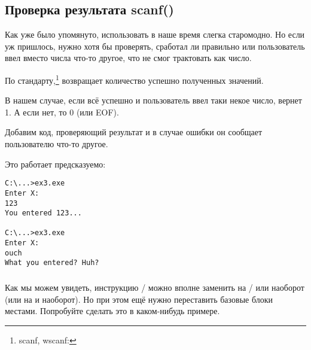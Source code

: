 \subsection{Проверка результата scanf()}

Как уже было упомянуто, использовать \scanf в наше время слегка старомодно. 
Но если уж пришлось, нужно хотя бы проверять, сработал ли \scanf 
правильно или пользователь ввел вместо числа что-то другое, что \scanf не смог трактовать как число.



По стандарту,\scanf\footnote{scanf, wscanf: \MSDNscanf} возвращает количество успешно полученных значений.

В нашем случае, если всё успешно и пользователь ввел таки некое число, \scanf вернет 1. А если нет, то 0 (или \ac{EOF}).

Добавим код, проверяющий результат \scanf и в случае ошибки он сообщает пользователю что-то другое.

Это работает предсказуемо:

\begin{lstlisting}
C:\...>ex3.exe
Enter X:
123
You entered 123...

C:\...>ex3.exe
Enter X:
ouch
What you entered? Huh?
\end{lstlisting}






\subsubsection{\Exercise}

Как мы можем увидеть, инструкцию / можно вполне заменить на / или наоборот 
(или  на  и наоборот).
Но при этом ещё нужно переставить базовые блоки местами.
Попробуйте сделать это в каком-нибудь примере.
